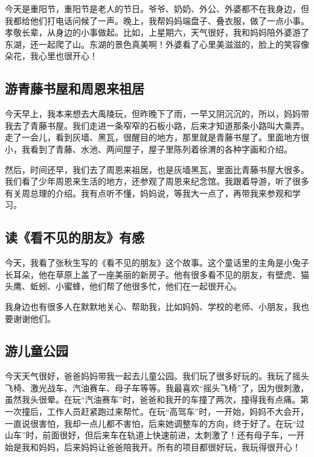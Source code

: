 \documentclass[UTF8,a4paper,titlepage,twoside,10.5pt]{article}
\begin{document}
今天是重阳节，重阳节是老人的节日。爷爷、奶奶、外公、外婆都不在我身边，但我都给他们打电话问候了一声。晚上，我帮妈妈端盘子、叠衣服，做了一点小事。孝敬长辈，从身边的小事做起。比如，上星期六，天气很好，我和妈妈陪外婆游了东湖，还一起爬了山。东湖的景色真美啊！外婆看了心里美滋滋的，脸上的笑容像朵花，我心里也很开心！

\subsection{游青藤书屋和周恩来祖居}
\label{sec:orgae9636a}

今天早上，我本来想去大禹陵玩，但昨晚下了雨，一早又阴沉沉的，所以，妈妈带我去了青藤书屋。我们走进一条窄窄的石板小路，后来才知道那条小路叫大乘弄。走了一会儿，看到灰墙、黑瓦，很醒目的地方，那里就是青藤书屋了。里面地方很小，我看到了青藤、水池、两间屋子，屋子里陈列着徐渭的各种字画和介绍。

然后，时间还早，我们去了周恩来祖居，也是灰墙黑瓦，里面比青藤书屋大很多。我们看了少年周恩来生活的地方，还参观了周恩来纪念馆。我跟着导游，听了很多有关周总理的介绍。我有点听不懂，妈妈说，等我大一点了，再带我来参观和学习。

\subsection{读《看不见的朋友》有感}
\label{sec:orgfb6d374}

今天，我看了张秋生写的《看不见的朋友》这个故事。这个童话里的主角是小兔子长耳朵，他在草原上盖了一座美丽的新房子。他有很多看不见的朋友，有壁虎、猫头鹰、蚯蚓、小蜜蜂，他们帮了他很多忙，他们在一起很开心。

我身边也有很多人在默默地关心、帮助我，比如妈妈、学校的老师、小朋友，我也要谢谢他们。

\subsection{游儿童公园}
\label{sec:org51913c3}

今天天气很好，爸爸妈妈带我一起去儿童公园。我们玩了很多好玩的。我玩了摇头飞椅、激光战车、汽油赛车、母子车等等。我最喜欢“摇头飞椅”了，因为很刺激，虽然我头很晕。在玩“汽油赛车”时，爸爸和我开的车撞了两次，撞得我有点痛。第一次撞后，工作人员赶紧跑过来帮忙。在玩“高驾车”时，一开始，妈妈不大会开，一直说很害怕，我却一点儿都不害怕，后来她调整车的方向，终于好了。在玩“过山车”时，前面很好，但后来车在轨道上快速前进，太刺激了！还有母子车，一开始是我和妈妈，后来妈妈让爸爸陪我开。所有的项目都很好玩，我玩得很开心！
\end{document}
